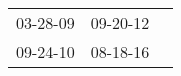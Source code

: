 \begin{supertabular}{lll}
 03-28-09\textsuperscript{} &  09-20-12\textsuperscript{} \\
 09-24-10\textsuperscript{} &  08-18-16\textsuperscript{} \\
\end{supertabular}
